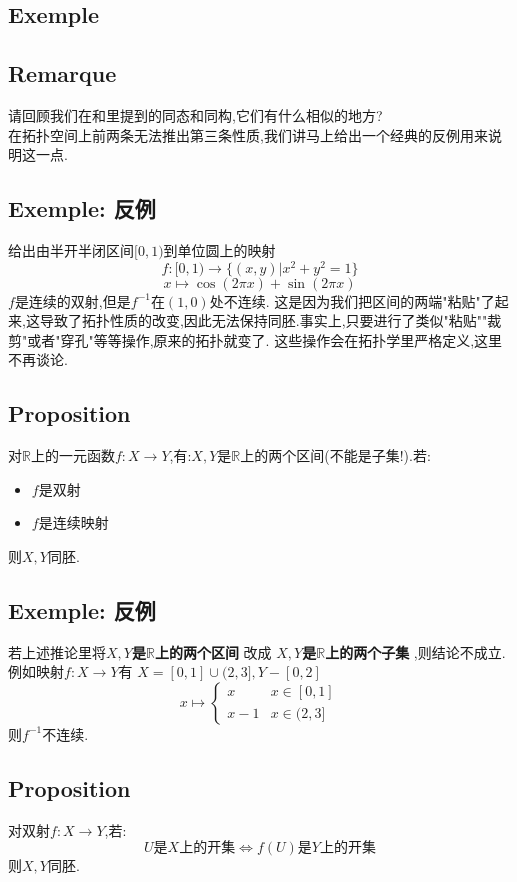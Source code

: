 \documentclass[12pt, a4paper, oneside]{ctexbook}
\newcommand{\R }{\mathbb{R}}%
\begin{document}
  \subsection{Exemple}
  \subsection{Remarque}
  请回顾我们在和里提到的同态和同构,它们有什么相似的地方?\\

  在拓扑空间上前两条无法推出第三条性质,我们讲马上给出一个经典的反例用来说明这一点.
  \subsection{Exemple: 反例}
  给出由半开半闭区间$[0,1)$到单位圆上的映射
  $$
  f:[0,1)\rightarrow \{(x,y)|x^2+y^2=1\}
  $$
  $$
  x\mapsto\cos(2\pi x)+\sin(2\pi x)
  $$
  $f$是连续的双射,但是$f^{-1}$在$(1,0)$处不连续.
  这是因为我们把区间的两端"粘贴"了起来,这导致了拓扑性质的改变,因此无法保持同胚.事实上,只要进行了类似"粘贴""裁剪"或者"穿孔"等等操作,原来的拓扑就变了.
  这些操作会在拓扑学里严格定义,这里不再谈论.
  \subsection{Proposition}
  对$\R$上的一元函数$f:X\rightarrow Y$,有:$X,Y$是$\R$上的两个区间(不能是子集!).若:
  \begin{itemize}
    \item $f$是双射
    \item $f$是连续映射
  \end{itemize}
  则$X,Y$同胚.
  \subsection{Exemple: 反例}
  若上述推论里将\textbf{$X,Y$是$\R$上的两个区间} 改成 \textbf{$X,Y$是$\R$上的两个子集} ,则结论不成立.
  例如映射$f:X\rightarrow Y$有 $X=[0,1]\cup(2,3],Y-[0,2]$
  $$
  x\mapsto 
  \begin{cases}
    x &x\in[0,1]\\
    x-1 &x\in (2,3]
    \end{cases}
  $$
  则$f^{-1}$不连续.
  \subsection{Proposition}
  对双射$f:X\rightarrow Y$,若:
  $$
  U\text{是$X$上的开集}\Leftrightarrow f(U)\text{是$Y$上的开集}
  $$
  则$X,Y$同胚.
\end{document}
